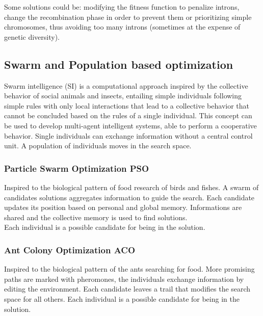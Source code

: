 Some solutions could be: modifying the fitness function to penalize introns, change the recombination phase in order to prevent them or prioritizing simple chromosomes, thus avoiding too many introns (sometimes at the expense of genetic diversity).\\

\subsection{Swarm and Population based optimization}

Swarm intelligence (SI) is a computational approach inspired by the collective behavior of social animals and insects, entailing simple individuals following simple rules with only local interactions that lead to a collective behavior that cannot be concluded based on the rules of a single individual. This concept can be used to develop multi-agent intelligent systems, able to perform a cooperative behavior. Single individuals can exchange information without a central control unit. A population of individuals moves in the search space.\\

\subsubsection{Particle Swarm Optimization PSO}

Inspired to the biological pattern of food research of birds and fishes. A swarm of candidates solutions aggregates information to guide the search. Each candidate updates its position based on personal and global memory. Informations are shared and the collective memory is used to find solutions.\\
Each individual  is a possible candidate for being in the solution.\\

\subsubsection{Ant Colony Optimization ACO}

Inspired to the biological pattern of the ants searching for food. More promising paths are marked with pheromones, the individuals exchange information by editing the environment. Each candidate leaves a trail that modifies the search space for all others. Each individual is a possible candidate for being in the solution.\\

